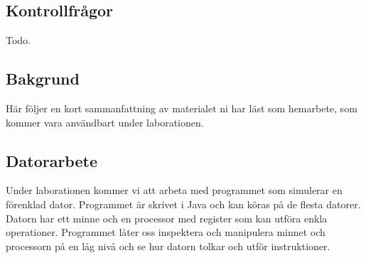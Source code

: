 \subsection*{Kontrollfrågor}
\begin{Kontrollfragor}
    \item Todo.
\end{Kontrollfragor}

\subsection*{Bakgrund}
Här följer en kort sammanfattning av materialet ni har läst som hemarbete, som kommer vara användbart under laborationen.

% 

\clearpage
\subsection*{Datorarbete}
Under laborationen kommer vi att arbeta med programmet \progname{} som simulerar en förenklad dator. Programmet är skrivet i Java och kan köras på de flesta datorer. Datorn har ett minne och en processor med register som kan utföra enkla operationer. Programmet låter oss inspektera och manipulera minnet och processorn på en låg nivå och se hur datorn tolkar och utför instruktioner.

